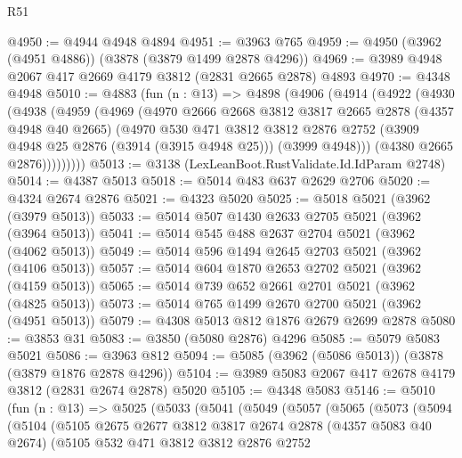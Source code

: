 \begin{lexlean}{R51}
\begin{coremodule}
@4950 := @4944 @4948 @4894
@4951 := @3963 @765
@4959 := @4950 (@3962 (@4951 @4886)) (@3878 (@3879 @1499 @2878 @4296))
@4969 := @3989 @4948 @2067 @417 @2669 @4179 @3812 (@2831 @2665 @2878) @4893
@4970 := @4348 @4948
@5010 := @4883
    (fun (n : @13) =>
    @4898
      (@4906
        (@4914
          (@4922
            (@4930
              (@4938
                (@4959
                  (@4969
                    (@4970
                      @2666
                      @2668
                      @3812
                      @3817
                      @2665
                      @2878
                      (@4357 @4948 @40 @2665)
                      (@4970
                        @530
                        @471
                        @3812
                        @3812
                        @2876
                        @2752
                        (@3909 @4948 @25 @2876 (@3914 (@3915 @4948 @25)))
                        (@3999 @4948)))
                    (@4380 @2665 @2876)))))))))
@5013 := @3138 (LexLeanBoot.RustValidate.Id.IdParam @2748)
@5014 := @4387 @5013
@5018 := @5014 @483 @637 @2629 @2706
@5020 := @4324 @2674 @2876
@5021 := @4323 @5020
@5025 := @5018 @5021 (@3962 (@3979 @5013))
@5033 := @5014 @507 @1430 @2633 @2705 @5021 (@3962 (@3964 @5013))
@5041 := @5014 @545 @488 @2637 @2704 @5021 (@3962 (@4062 @5013))
@5049 := @5014 @596 @1494 @2645 @2703 @5021 (@3962 (@4106 @5013))
@5057 := @5014 @604 @1870 @2653 @2702 @5021 (@3962 (@4159 @5013))
@5065 := @5014 @739 @652 @2661 @2701 @5021 (@3962 (@4825 @5013))
@5073 := @5014 @765 @1499 @2670 @2700 @5021 (@3962 (@4951 @5013))
@5079 := @4308 @5013 @812 @1876 @2679 @2699 @2878
@5080 := @3853 @31
@5083 := @3850 (@5080 @2876) @4296
@5085 := @5079 @5083 @5021
@5086 := @3963 @812
@5094 := @5085 (@3962 (@5086 @5013)) (@3878 (@3879 @1876 @2878 @4296))
@5104 := @3989 @5083 @2067 @417 @2678 @4179 @3812 (@2831 @2674 @2878) @5020
@5105 := @4348 @5083
@5146 := @5010
    (fun (n : @13) =>
    @5025
      (@5033
        (@5041
          (@5049
            (@5057
              (@5065
                (@5073
                  (@5094
                    (@5104
                      (@5105
                        @2675
                        @2677
                        @3812
                        @3817
                        @2674
                        @2878
                        (@4357 @5083 @40 @2674)
                        (@5105
                          @532
                          @471
                          @3812
                          @3812
                          @2876
                          @2752

\end{coremodule}
\end{lexlean}
